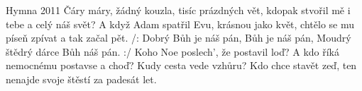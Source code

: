\begin{TEXT}{Hymna 2011}
\SLOKA Čáry máry, žádný kouzla, tisíc prázdných vět,
kdopak stvořil mě i tebe a celý náš svět?
A když Adam spatřil Evu, krásnou jako květ,
chtělo se mu píseň zpívat a tak začal pět.
\REFREN /: Dobrý Bůh je náš pán, Bůh je náš pán,
Moudrý štědrý dárce Bůh náš pán. :/
\SLOKA Koho Noe poslech', že postavil loď?
A kdo říká nemocnému postavse a choď?
Kudy cesta vede vzhůru? Kdo chce stavět zeď,
ten nenajde svoje štěstí za padesát let.
\end{TEXT}